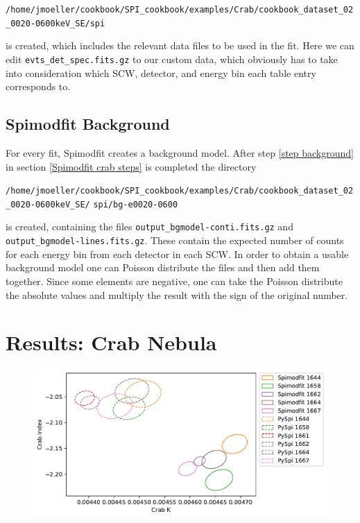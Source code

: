 \documentclass{article}
\begin{document}
\verb|/home/jmoeller/cookbook/SPI_cookbook/examples/Crab/cookbook_dataset_02_0020-0600keV_SE/spi|

is created, which includes the relevant data files to be used in the fit. Here we can edit \verb|evts_det_spec.fits.gz| to our custom data, which obviously has to take into consideration which SCW, detector, and energy bin each table entry corresponds to. 


\subsection{Spimodfit Background} \label{spimodfit bkg}
For every fit, Spimodfit creates a background model. After step \ref{step background} in section \ref{Spimodfit crab steps} is completed the directory

\verb|/home/jmoeller/cookbook/SPI_cookbook/examples/Crab/cookbook_dataset_02_0020-0600keV_SE/|\newline
\verb|spi/bg-e0020-0600|

is created, containing the files \verb|output_bgmodel-conti.fits.gz| and \verb|output_bgmodel-lines.fits.gz|. These contain the expected number of counts for each energy bin from each detector in each SCW. In order to obtain a usable background model one can Poisson distribute the files and then add them together. Since some elements are negative, one can take the Poisson distribute the absolute values and multiply the result with the sign of the original number. 



\section{Results: Crab Nebula}

\begin{figure}[h]
    \includegraphics[width=\textwidth]{Images/crab_ps_smf_wo_out.pdf}
    \caption{}
    \label{Crab}
\end{figure}
\end{document}
